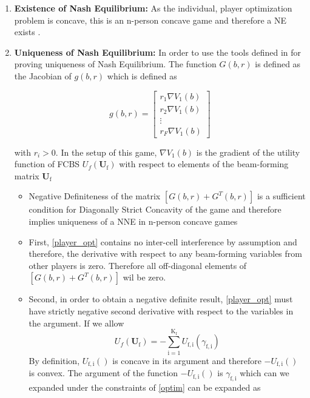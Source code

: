 \documentclass[12pt,a4paper]{report}
\begin{document}
\begin{enumerate}
\item \textbf{Existence of Nash Equilibrium:} As the individual, player optimization problem is concave, this is an n-person concave game and therefore a NE exists \cite[Thm1]{rosen1964existence}. 
\item \textbf{Uniqueness of Nash Equilibrium:} In order to use the tools defined in \cite[Thm4]{rosen1964existence} for proving uniqueness of Nash Equilibrium. The function $G(b,r) $ is defined as the Jacobian of $g(b,r) $ which is defined as 

\begin{equation}
g(b,r)= 
\begin{bmatrix}
r_1 \nabla V_{1}(b)
\\
r_2 \nabla V_{1}(b)
\\
\vdots\\
r_F \nabla V_{1}(b)
\end{bmatrix}
\end{equation}

with $r_i>0$.
In the setup of this game, $\nabla V_{1}(b)$
is the gradient of the utility function of FCBS $U_f(\mathbf{U}_{\mathrm{f}}) $ with respect to elements of the  beam-forming matrix 
$\mathbf{U}_{\mathrm{f}}$


\begin{itemize}
\item
Negative Definiteness of the matrix $[G(b,r)+G^{T}(b,r)] $ is a sufficient condition for Diagonally Strict Concavity of the game and therefore implies uniqueness of a NNE in n-person concave games \cite[Thm6]{rosen1964existence}
	 
\item First, \eqref{player_opt} contains no inter-cell interference by assumption and therefore, the derivative with respect to any beam-forming variables from other players is zero. Therefore all off-diagonal elements of $[G(b,r)+G^{T}(b,r)] $ wil be zero.
\item Second, in order to obtain a negative definite result, \eqref{player_opt} must have strictly negative second derivative with respect to the variables in the argument. If we allow
\begin{equation*}
		U_f(\mathbf{U}_\mathrm{f})=
	    - \sum_{\mathrm{i=1}}^{\mathrm{K_f}}
    	U_{\mathrm{f,i}}(\gamma_{\mathrm{f,i}})
\end{equation*}
By definition, $U_{\mathrm{f,i}}()$ is concave in its argument and therefore $- U_{\mathrm{f,i}}()$ is convex.
The argument of the function $- U_{\mathrm{f,i}}()$  is $\gamma_{\mathrm{f,i}}$ which can we expanded under the constraints of  \eqref{optim} can be expanded as 


\end{itemize}
\end{enumerate}
\end{document}
